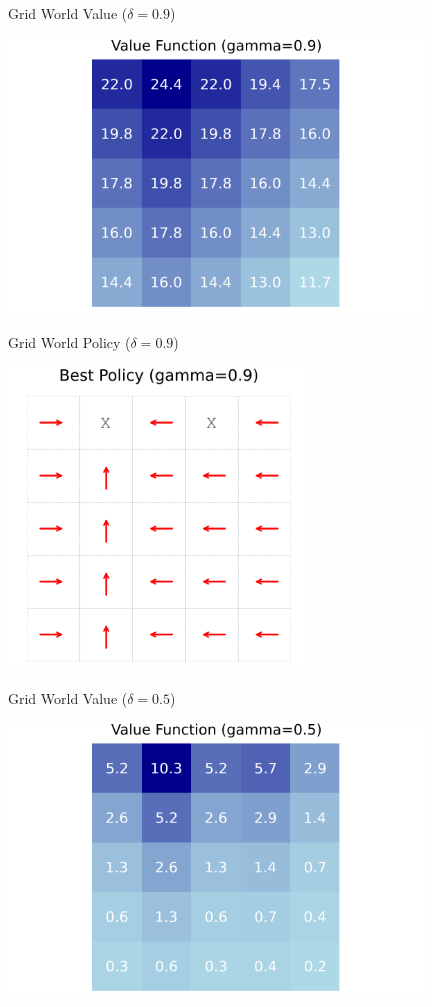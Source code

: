 \documentclass{beamer}
\begin{document}
\begin{frame}{Grid World Value ($\delta = 0.9$)}
\begin{center}
	\includegraphics[width=11cm]{grid_world_value_09.png}
	\end{center}
\end{frame}
\begin{frame}{Grid World Policy ($\delta = 0.9$)}
\begin{center}
	\includegraphics[width=8cm]{grid_world_policy_09.png}
\end{center}
\end{frame}
\begin{frame}{Grid World Value ($\delta = 0.5$)}
\begin{center}
	\includegraphics[width=11cm]{grid_world_value_05.png}
	\end{center}
\end{frame}
\end{document}
